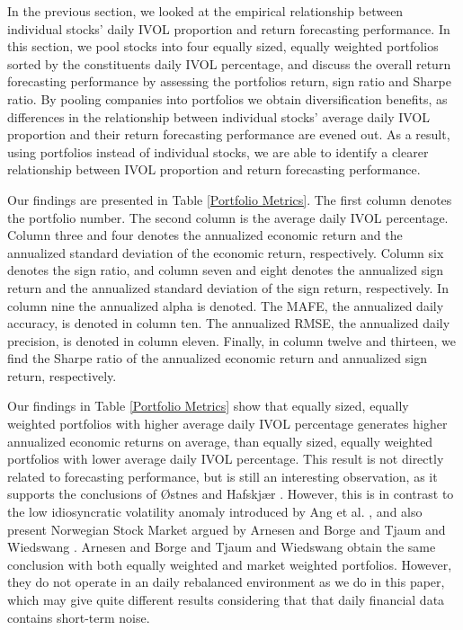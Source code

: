 In the previous section, we looked at the empirical relationship between individual stocks' daily IVOL proportion and return forecasting performance. In this section, we pool stocks into four equally sized, equally weighted portfolios sorted by the constituents daily IVOL percentage, and discuss the overall return forecasting performance by assessing the portfolios return, sign ratio and Sharpe ratio. By pooling companies into portfolios we obtain diversification benefits, as differences in the relationship between individual stocks' average daily IVOL proportion and their return forecasting performance are evened out. As a result, using portfolios instead of individual stocks, we are able to identify a clearer relationship between IVOL proportion and return forecasting performance. 

Our findings are presented in Table \ref{Portfolio Metrics}. The first column denotes the portfolio number. The second column is the average daily IVOL percentage. Column three and four denotes the annualized economic return and the annualized standard deviation of the economic return, respectively. Column six denotes the sign ratio, and column seven and eight denotes the annualized sign return and the annualized standard deviation of the sign return, respectively. In column nine the annualized alpha is denoted. The MAFE, the annualized daily accuracy, is denoted in column ten. The annualized RMSE, the annualized daily precision, is denoted in column eleven. Finally, in column twelve and thirteen, we find the Sharpe ratio of the annualized economic return and annualized sign return, respectively. 

Our findings in Table \ref{Portfolio Metrics} show that equally sized, equally weighted portfolios with higher average daily IVOL percentage generates higher annualized economic returns on average, than equally sized, equally weighted portfolios with lower average daily IVOL percentage. This result is not directly related to forecasting performance, but is still an interesting observation, as it supports the conclusions of Østnes and Hafskjær \cite{ostnes}. However, this is in contrast to the low idiosyncratic volatility anomaly introduced by Ang et al. \cite{angetal06}, and also present Norwegian Stock Market argued by Arnesen and Borge \cite{arnborge} and Tjaum and Wiedswang \cite{thaumwiedswang}. Arnesen and Borge \cite{arnborge} and Tjaum and Wiedswang \cite{thaumwiedswang} obtain the same conclusion with both equally weighted and market weighted portfolios. However, they do not operate in an daily rebalanced environment as we do in this paper, which may give quite different results considering that that daily financial data contains short-term noise. 

